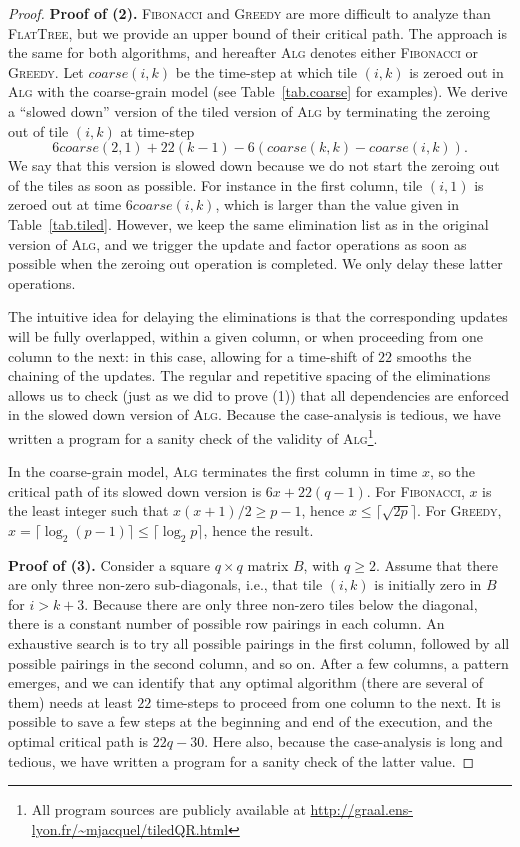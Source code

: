 \documentclass[a4paper,twopages]{article}
\newcommand{\coarse}{\ensuremath{\mathit{coarse}}\xspace}
\newcommand{\MC}{\textsc{Fibonacci}\xspace}
\newcommand{\Greedy}{\textsc{Greedy}\xspace}
\newcommand{\FT}{\textsc{FlatTree}\xspace}
\newcommand{\Alg}{\textsc{Alg}\xspace}
\newcommand{\TiledQRURL}{\url{http://graal.ens-lyon.fr/~mjacquel/tiledQR.html}\xspace}
\begin{document}
\begin{proof}
\textbf{Proof of (2).}
    \MC and \Greedy are more difficult to analyze than \FT, but we provide an
    upper bound of their critical path. The approach is the same for both
    algorithms, and hereafter \Alg denotes either \MC or \Greedy.  Let
    $\coarse(i,k)$ be the time-step at which tile $(i,k)$ is zeroed out in \Alg
    with the coarse-grain model (see Table~\ref{tab.coarse} for examples).  We
    derive a ``slowed down'' version of the tiled version of \Alg by
    terminating the zeroing out of tile $(i,k)$ at time-step
    $$6 \coarse(2,1) +
    22(k-1) - 6 (\coarse(k,k) - \coarse(i,k)).$$
    We say that this version is
    slowed down because we do not start the zeroing out of the tiles as soon as
    possible. For instance in the first column, tile $(i,1)$ is zeroed out at
    time $6 \coarse(i,k)$, which is larger than the value given in
    Table~\ref{tab.tiled}.  However, we keep the same elimination list as in
    the original version of \Alg, and we trigger the update and factor
    operations as soon as possible when the zeroing out operation is completed.
    We only delay these latter operations.

    The intuitive idea for delaying the eliminations is that the corresponding
    updates will be fully overlapped, within a given column, or when proceeding
    from one column to the next: in this case, allowing for a time-shift of
    $22$ smooths the chaining of the updates. The regular and repetitive
    spacing of the eliminations allows us to check (just as we did to prove (1))
    that all dependencies are enforced in the slowed down version of \Alg.
    Because the case-analysis is tedious, we have written a program for a
    sanity check of the validity of \Alg\footnote{All program sources are
    publicly available at \TiledQRURL}.

    In the coarse-grain model, \Alg  terminates the first column in time $x$,
    so the critical path of its slowed down version is $6x + 22(q-1)$. For \MC,
    $x$ is the least integer such that $x(x+1)/2 \geq  p-1$, hence $x \leq
    \lceil \sqrt{2p} \rceil$.  For \Greedy, $x = \lceil \log_2(p-1) \rceil \leq
    \lceil \log_2{p} \rceil$, hence the result.

\textbf{Proof of (3).}
    Consider a square $q \times q$ matrix $B$, with $q \geq 2$. Assume that there
    are only three non-zero sub-diagonals, i.e., that tile $(i,k)$ is initially
    zero in $B$ for $i > k+3$. Because there are only three non-zero tiles below the
    diagonal, there is a constant number of possible row pairings in each
    column. An exhaustive search is to try all possible pairings in the first
    column, followed by all possible pairings in the second column, and so on.
    After a few columns, a pattern emerges, and we can identify that any
    optimal algorithm (there are several of them) needs at least $22$
    time-steps to proceed from one column to the next.  It is possible to save
    a few steps at the beginning and end of the execution, and the optimal
    critical path is $22q - 30$. Here also, because the case-analysis is long
    and tedious, we have written a program for a sanity check of the latter
    value.


\end{proof}
\end{document}
